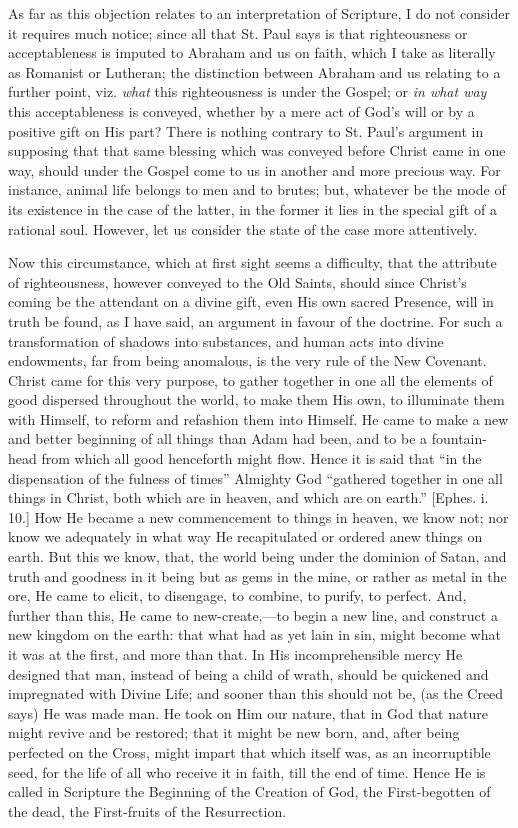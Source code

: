 As far as this objection relates to an interpretation of Scripture,
I do not consider it requires much notice; since all that St. Paul says
is that righteousness or acceptableness is imputed to Abraham and us
on faith, which I take as literally as Romanist or Lutheran; the distinction between Abraham and us relating to a further point, viz. \emph{what}
this righteousness is under the Gospel; or \emph{in what way} this
acceptableness is conveyed, whether by a mere act of God's will or by
a positive gift on His part? There is nothing contrary to St. Paul's
argument in supposing that that same blessing which was conveyed
before Christ came in one way, should under the Gospel come to us in
another and more precious way. For instance, animal life belongs to
men and to brutes; but, whatever be the mode of its existence in the
case of the latter, in the former it lies in the special gift of a
rational soul. However, let us consider the state of the case more
attentively.

Now this circumstance, which at first sight seems a difficulty,
that the attribute of righteousness, however conveyed to the Old
Saints, should since Christ's coming be the attendant on a divine
gift, even His own sacred Presence, will in truth be found, as I have
said, an argument in favour of the doctrine. For such a transformation
of shadows into substances, and human acts into divine endowments, far
from being anomalous, is the very rule of the New Covenant. Christ
came for this very purpose, to gather together in one all the elements
of good dispersed throughout the world, to make them His own, to
illuminate them with Himself, to reform and refashion them into
Himself. He came to make a new and better beginning of all things than
Adam had been, and to be a fountain-head from which all good
henceforth might flow. Hence it is said that ``in the dispensation
of the fulness of times'' Almighty God ``gathered together in
one all things in Christ, both which are in heaven, and which
are on earth.'' [Ephes. i. 10.] How He became a new commencement
to things in heaven, we know not; nor know we adequately in what way
He recapitulated or ordered anew things on earth. But this we know,
that, the world being under the dominion of Satan, and truth and
goodness in it being but as gems in the mine, or rather as metal in
the ore, He came to elicit, to disengage, to combine, to purify, to
perfect. And, further than this, He came to new-create,—to begin a
new line, and construct a new kingdom on the earth: that what had as
yet lain in sin, might become what it was at the first, and more than
that. In His incomprehensible mercy He designed that man, instead of
being a child of wrath, should be quickened and impregnated with
Divine Life; and sooner than this should not be, (as the Creed says)
He was made man. He took on Him our nature, that in God that nature
might revive and be restored; that it might be new born, and, after
being perfected on the Cross, might impart that which itself was, as
an incorruptible seed, for the life of all who receive it in faith,
till the end of time. Hence He is called in Scripture the Beginning of
the Creation of God, the First-begotten of the dead, the First-fruits
of the Resurrection.

